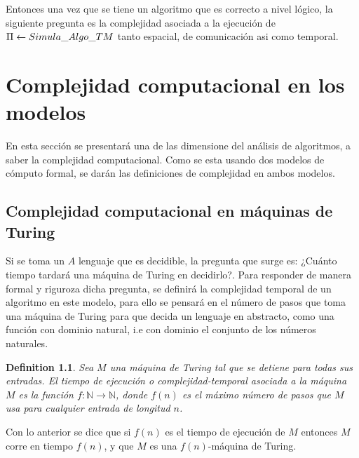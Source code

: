 \documentclass[10pt]{report}
\newtheorem{definition}{Definition}
\begin{document}
    Entonces una vez que se tiene un algoritmo que es correcto a nivel lógico,
    la siguiente pregunta es la complejidad asociada a la ejecución de $\Pi \gets Simula\char95Algo\char95TM$
    tanto espacial, de comunicación asi como temporal.
    \newpage

    \chapter{Complejidad computacional en los modelos}
    En esta sección se presentará una de las dimensione del análisis de algoritmos, a saber la complejidad computacional.
    Como se esta usando dos modelos de cómputo formal, se darán las definiciones de complejidad en ambos modelos.

    \section{Complejidad computacional en máquinas de Turing}
    Si se toma un $A$ lenguaje que es decidible, la pregunta que surge es: ¿Cuánto tiempo tardará una máquina de Turing
    en decidirlo?.
    Para responder de manera formal y riguroza dicha pregunta, se definirá la complejidad temporal de un algoritmo
    en este modelo, para ello se pensará en el número de pasos que toma una máquina de Turing para que decida un lenguaje
    en abstracto, como una función con dominio natural, i.e con dominio el conjunto de los números naturales.

    \begin{definition}
        Sea $M$ una máquina de Turing tal que se detiene para todas sus entradas.\newline
        El tiempo de ejecución o complejidad-temporal asociada a la máquina $M$ es la función
        $f:\mathbb{N}\rightarrow\mathbb{N} $, donde $f(n)$ es el máximo número de pasos que $M$ usa para cualquier entrada de
        longitud $n$.
    \end{definition}
    Con lo anterior se dice que si $f(n)$ es el tiempo de ejecución de $M$ entonces $M$ corre en tiempo $f(n)$,
    y que $M$ es una $f(n)$-máquina de Turing.
\end{document}

